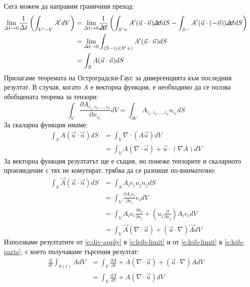\documentclass[12pt]{article}
\numberwithin{equation}{section}
\begin{document}
Сега можем да направим граничния преход:
\begin{equation}
    \label{e:leib-limit}
    \begin{aligned}
        \underset{\Delta t \rightarrow 0}{\lim}\frac{1}{\Delta t} \left( \int_{V^\prime -V}A^\prime dV \right) &= \underset{\Delta t \rightarrow 0}{\lim}\frac{1}{\cancel{\Delta t}} \left( \int_{S^\prime+}A^\prime (\vec{u}\cdot\vec{n})\cancel{\Delta t} dS - \int_{S-}A^\prime (\vec{u}\cdot(-\vec{n}))\cancel{\Delta t} dS \right) \\
        &= \underset{\Delta t \rightarrow 0}{\lim}\int_{(S-) \cup (S^\prime+)} A^\prime(\vec{u}\cdot\vec{n})dS \\
        &= \int_S A(\vec{u}\cdot\vec{n})dS
    \end{aligned}
\end{equation}
Прилагаме теоремата на Остроградски-Гаус за дивергенцията към последния резултат. В случая, когато $A$ е векторна функция, е необходимо да се ползва обобщената теорема за тензори\cite{div-theorem}:
\begin{equation}
    \int_V \frac{\partial A_{i_1,i_2,...,i_n}}{\partial x_{i_k}}dV=\int_{\partial V}A_{i_1,i_2,...,i_n}n_{i_k}dS
\end{equation}
За скаларна функция имаме:
\begin{equation}
    \begin{aligned}
        \int_S A(\vec{u}\cdot\vec{n})dS&=\int_V \nabla\cdot(A\vec{u}) dV \\
        &= \int_V A(\nabla\cdot\vec{u}) + \vec{u}\cdot(\nabla A) dV
    \end{aligned}
\end{equation}
За векторна функция резултатът ще е същия, но понеже тензорите и скаларното произведение с тях не комутират, трябва да се разпише по-внимателно:
\begin{equation}
    \label{e:div-apply}
    \begin{aligned}
        \int_S \vec{A}(\vec{u}\cdot\vec{n})dS&=\int_S A_i e_i u_j n_j dS \\
        &=\int_V \frac{\partial A_i u_j}{\partial x_j} e_i dV \\
        &=\int_V A_i e_i \frac{\partial u_j}{\partial x_j} + (u_j \frac{\partial}{\partial x_j}) A_i e_i dV \\
        &=\int_V \vec{A}(\nabla\cdot\vec{u}) + (\vec{u}\cdot\nabla) \vec{A} dV
    \end{aligned}
\end{equation}
Използваме резултатите от \autoref{e:div-apply} в \autoref{e:leib-limit} и от \autoref{e:leib-limit} в \autoref{e:leib-parts}, с което получаваме търсения резултат:
\begin{equation}
    \begin{aligned}
        \frac{d}{dt}\int_{V(t)}A dV &= \int_V \frac{\partial A}{\partial t} + A(\nabla\cdot\vec{u}) + (\vec{u}\cdot\nabla)A dV \\
        &= \int_V \frac{d A}{d t} + A(\nabla\cdot\vec{u}) dV
    \end{aligned}
\end{equation}
\end{document}
